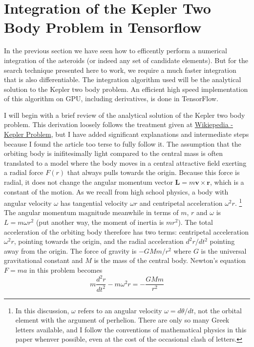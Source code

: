\section{Integration of the Kepler Two Body Problem in Tensorflow}
\label{section_kepler_two_body_tensorflow}
In the previous section we have seen how to efficently perform a numerical integration of the asteroids (or indeed any set of candidate elements).
But for the search technique presented here to work, we require a much faster integration that is also differentiable.
The integration algorithm used will be the analytical solution to the Kepler two body problem.
An efficient high speed implementation of this algorithm on GPU, including derivatives, is done in TensorFlow.

I will begin with a brief review of the analytical solution of the Kepler two body problem.
This derivation loosely follows the treatment given at \href{https://en.wikipedia.org/wiki/Kepler_problem}{Wikiepedia - Kepler Problem},
but I have added significant explanations and intermediate steps because I found the article too terse to fully follow it.
The assumption that the orbiting body is inifitesimally light compared to the central mass is often translated to a model 
where the body moves in a central attractive field exerting a radial force $F(r)$ that always pulls towards the origin.
Because this force is radial, it does not change the angular momentum vector $\mathbf{L} = m\mathbf{v} \times \mathbf{r}$, 
which is a constant of the motion.
As we recall from high school physics, a body with angular velocity $\omega$ has tangential velocity $\omega r$
and centripetal acceleration $\omega^2 r$.
\footnote{
In this discussion, $\omega$ refers to an angular velocity $\omega = d\theta / dt$, not the orbital element with the argument of perhelion.
There are only so many Greek letters available, and I follow the conventions of mathematical physics in this paper whenver possible,
even at the cost of the occasional clash of letters.}
The angular momentum magnitude meanwhile in terms of $m$, $r$ and $\omega$ is $L = m \omega r^2$ 
(put another way, the moment of inertia is $mr^2$).
The total acceleration of the orbiting body therefore has two terms: centripetal acceleration $\omega^2r$, pointing towards the origin,
and the radial acceleration $d^2r / dt^2$ pointing away from the origin.
The force of gravity is $-G M m / r^2$ where $G$ is the universal gravitational constant and $M$ is the mass of the central body.
Newton's equation $F = ma$ in this problem becomes
$$ m \frac{d^2r}{dt^2} - m \omega^2 r = - \frac{G M m }{r^2}$$
